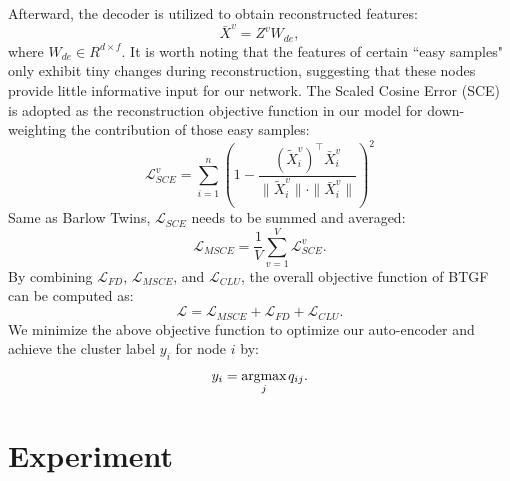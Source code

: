 \documentclass[letterpaper]{article} %
\begin{document}
Afterward, the decoder is utilized to obtain reconstructed features:
\begin{equation}
    \bar{X}^v = Z^v W_{de},
\end{equation}
where $W_{de} \in R^{d \times f}$. It is worth noting that the features of certain ``easy samples" only exhibit tiny changes during reconstruction, suggesting that these nodes provide little informative input for our network. The Scaled Cosine Error (SCE) \cite{hou2022graphmae} is adopted as the reconstruction objective function in our model for down-weighting the contribution of those easy samples:
\begin{equation}\label{loss: sce}
\mathcal{L}^v_{SCE} = \sum_{i=1}^n \left(1 - \frac{{(\widetilde{X}^v_i)^{\top} \bar{X}^v_i}}{{\|\widetilde{X}^v_i\| \cdot \|\bar{X}^v_i\|}}\right)^2
\end{equation}
Same as Barlow Twins,  $\mathcal{L}_{SCE}$ needs to be summed and averaged:
\begin{equation}
\mathcal{L}_{MSCE} = \frac{1}{V} \sum^{V}_{v=1} \mathcal{L}^{v}_{SCE}.
\end{equation}
By combining $\mathcal{L}_{FD}$, $\mathcal{L}_{MSCE}$, and $\mathcal{L}_{C L U}$, the overall objective function of BTGF can be computed as:
\begin{equation}\label{loss: all}
    \mathcal{L}=\mathcal{L}_{MSCE} + \mathcal{L}_{FD}+ \mathcal{L}_{CLU}.
\end{equation}
We minimize the above objective function to optimize our auto-encoder and achieve the cluster label $y_i$ for node $i$ by:
\begin{equation}\label{node clustering}
    y_i=\underset{j}{\operatorname{argmax}}\hspace{0.4mm} q_{i j}.
\end{equation}


\section{Experiment}
\end{document}
